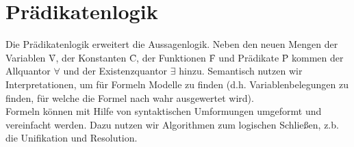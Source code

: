 \newcommand{\INT}{\mathcal{I}}
\newcommand{\ZUW}{\mathcal{Z}}
\newcommand{\FM}{\mathcal{T}}
\newcommand{\HU}{\Delta_{F}}
\newcommand{\HE}{\MT{HE}}


\section{Prädikatenlogik}
Die Prädikatenlogik erweitert die Aussagenlogik. Neben den neuen Mengen der Variablen \f{V}, der Konstanten \f{C}, der Funktionen \f{F} und Prädikate \f{P} kommen der Allquantor $\forall$ und der Existenzquantor $\exists$ hinzu. Semantisch nutzen wir Interpretationen, um für Formeln Modelle zu finden (d.h. Variablenbelegungen zu finden, für welche die Formel nach wahr ausgewertet wird). \\
Formeln können mit Hilfe von syntaktischen Umformungen umgeformt und vereinfacht werden. Dazu nutzen wir Algorithmen zum logischen Schließen, z.b. die Unifikation und Resolution. 

